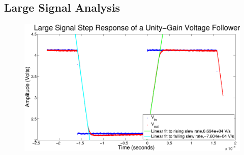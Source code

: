 \subsection*{Large Signal Analysis}


\begin{figure}[H]
\centering
\includegraphics[width=\linewidth]{../Figures/Exp3P1.eps}
\caption{}
\label{fig:exp3p1}
\end{figure}